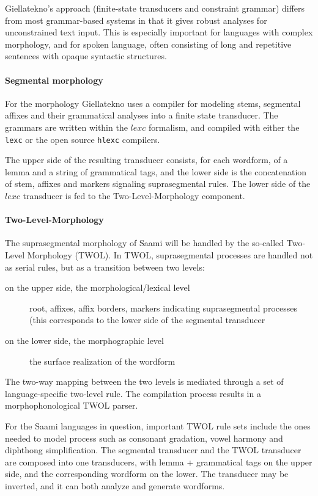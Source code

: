 \documentclass[a4paper,12pt]{article}
\begin{document}
Giellatekno's approach (finite-state transducers and constraint grammar) differs from most grammar-based systems in that it gives robust analyses for unconstrained text input. This is especially important for languages with complex morphology, and for spoken language, often consisting of long and repetitive sentences with opaque syntactic structures.

\paragraph{Segmental morphology}
For the morphology Giellatekno uses a compiler for modeling stems, segmental affixes and their grammatical analyses into a finite state transducer. The grammars are written within the $lexc$ formalism, and compiled with either the \texttt{lexc} or the open source \texttt{hlexc} compilers. 

The upper side of the resulting transducer consists, for each wordform, of a lemma and a string of grammatical tags, and the lower side is the concatenation of stem, affixes and markers signaling suprasegmental rules. The lower side of the $lexc$ transducer is fed to the Two-Level-Morphology component.

\paragraph{Two-Level-Morphology}
The suprasegmental morphology of Saami will be handled by the so-called Two-Level Morphology (TWOL). In TWOL, suprasegmental processes are handled not as serial rules, but as a transition between two levels:
\begin{description}
\item[on the upper side, the morphological/lexical level] root, affixes, affix borders, markers indicating suprasegmental processes (this corresponds to the lower side of the segmental transducer
\item[on the lower side, the morphographic level] the surface realization of the wordform
\end{description}

The two-way mapping between the two levels is mediated through a set of language-specific two-level rule. The compilation process results in a morphophonological TWOL parser.

For the Saami languages in question, important TWOL rule sets include the ones needed to model process such as consonant gradation, vowel harmony and diphthong simplification. The segmental transducer and the TWOL transducer are composed into one transducers, with lemma + grammatical tags on the upper side, and the corresponding wordform on the lower. The transducer may be inverted, and it can both analyze and generate wordforms.
\end{document}
